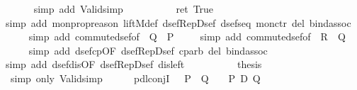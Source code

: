 \begin{isabellebody}
\ \ \ \ \isamarkupfalse%
\ {\isacharparenleft}simp\ add{\isacharcolon}\ Valid{\isacharunderscore}simp{\isacharparenright}\isanewline
\ \ %
\isanewline
\ \ \isamarkupfalse%
\ \isamarkupfalse%
\ {\isachardoublequote}{\isasymdots}\ {\isacharequal}\ ret\ True{\isachardoublequote}\isanewline
\ \ \ \ \isamarkupfalse%
simp\ add{\isacharcolon}\ mon{\isacharunderscore}prop{\isacharunderscore}reason\ liftM{}{\isacharunderscore}def\ dsef{\isacharunderscore}Rep{\isacharunderscore}Dsef\ dsef{\isacharunderscore}seq\ mon{\isacharunderscore}ctr\ del{\isacharcolon}\ bind{\isacharunderscore}assoc{\isacharparenright}\isanewline
\ \ \ \ \isamarkupfalse%
simp\ add{\isacharcolon}\ commute{\isacharunderscore}dsef{\isacharbrackleft}of\ {\isachardoublequote}{\isasymDown}\ Q{\isachardoublequote}\ {\isachardoublequote}{\isasymDown}\ P{\isachardoublequote}{\isacharbrackright}{\isacharparenright}\isanewline
\ \ \ \ \isamarkupfalse%
simp\ add{\isacharcolon}\ commute{\isacharunderscore}dsef{\isacharbrackleft}of\ {\isachardoublequote}{\isasymDown}\ R{\isachardoublequote}\ {\isachardoublequote}{\isasymDown}\ Q{\isachardoublequote}{\isacharbrackright}{\isacharparenright}\isanewline
\ \ \ \ \isamarkupfalse%
simp\ add{\isacharcolon}\ dsef{\isacharunderscore}cp{\isacharbrackleft}OF\ dsef{\isacharunderscore}Rep{\isacharunderscore}Dsef{\isacharbrackright}\ cp{\isacharunderscore}arb\ del{\isacharcolon}\ bind{\isacharunderscore}assoc{\isacharparenright}\isanewline
\ \ \ \ \isamarkupfalse%
simp\ add{\isacharcolon}\ dsef{\isacharunderscore}dis{\isacharbrackleft}OF\ dsef{\isacharunderscore}Rep{\isacharunderscore}Dsef{\isacharbrackright}\ dis{\isacharunderscore}left{}{\isacharparenright}\isanewline
\ \ \ \ \isamarkupfalse%
\isanewline
\ \ \isamarkupfalse%
\ \isamarkupfalse%
\ {\isacharquery}thesis\ \isamarkupfalse%
\ {\isacharparenleft}simp\ only{\isacharcolon}\ Valid{\isacharunderscore}simp{\isacharparenright}\isanewline
\isamarkupfalse%
\isanewline
\ \ \ \ \isanewline
\isanewline
\isamarkupfalse%
\ pdl{\isacharunderscore}conjI{\isacharcolon}\ {\isachardoublequote}{\isasymlbrakk}\ {\isasymturnstile}\ P{\isacharsemicolon}\ {\isasymturnstile}\ Q\ {\isasymrbrakk}\ {\isasymLongrightarrow}\ {\isasymturnstile}\ P\ {\isasymand}\isactrlsub D\ Q{\isachardoublequote}\isanewline

\end{isabellebody}
